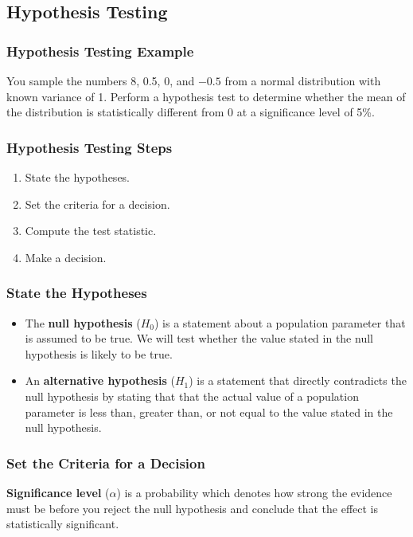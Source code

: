 \documentclass{beamer}
\begin{document}
\subsection{Hypothesis Testing}

\begin{frame}[t]
\frametitle{Hypothesis Testing Example}
\tiny
\begin{Example}
You sample the numbers 8, 0.5, 0, and $-0.5$ from a normal distribution with known variance of 1. Perform a hypothesis test to determine whether the mean of the distribution is statistically different from 0 at a significance level of 5\%.
\end{Example}

\end{frame}

\begin{frame}
\frametitle{Hypothesis Testing Steps}
\begin{enumerate}
\item State the hypotheses.
\item Set the criteria for a decision.
\item Compute the test statistic.
\item Make a decision.
\end{enumerate}
\end{frame}

\begin{frame}
\frametitle{State the Hypotheses}

\begin{Definition}
\begin{itemize}
\item The {\bf null hypothesis} ($H_0$) is a statement about a population parameter that is assumed to be true. We will test whether the value
stated in the null hypothesis is likely to be true.
\item An {\bf alternative hypothesis} ($H_1$) is a statement that directly contradicts the null hypothesis by stating that that the actual value of a population parameter is
less than, greater than, or not equal to the value stated in the null hypothesis.
\end{itemize}
\end{Definition}

\end{frame}

\begin{frame}
\frametitle{Set the Criteria for a Decision}

\begin{Definition}
{\bf Significance level} ($\alpha$) is a probability which denotes how strong the evidence must be before you reject the null hypothesis and conclude that the effect is statistically significant. 
\end{Definition}
\end{frame}
\end{document}
